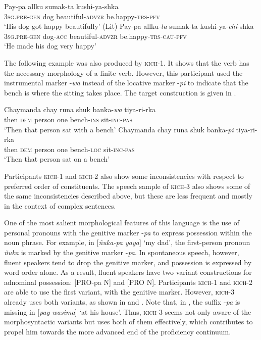 \documentclass[output=paper]{langscibook}
\begin{document}
\ea
\ea\label{ex:7:6a}
\gll   Pay-pa             allku       sumak-ta            kushi-ya-shka\\
             \textsc{3sg.pre-gen}    dog            beautiful-\textsc{advzr}     be.happy-\textsc{trs}{}-\textsc{pfv}\\
  \glt ‘His dog got happy beautifully’ (Lit)
\ex\label{ex:7:6b}
\gll Pay-pa        allku-\textit{ta} sumak-ta       kushi-ya-\textit{chi}{{}-shka}\\
\textsc{3sg.pre-gen}   dog-\textsc{acc}        beautiful-\textsc{advzr}     be.happy-\textsc{trs}{}-\textsc{cau}{}-\textsc{pfv}\\
  \glt ‘He made his dog very happy’
\z
\z

The following example was also produced by \textsc{kich-}1. It shows that the verb has the necessary morphology of a finite verb. However, this participant used the instrumental marker \-\-\nobreakdash-\textit{wa} instead of the locative marker \-\nobreakdash-\textit{pi} to indicate that the bench is where the sitting takes place. The target construction is given in .%

\ea
\ea\label{ex:7:7a}
\gll Chaymanda       chay   runa      shuk    banka-\textit{wa} tiya-ri-rka\\
         then      \textsc{dem}     person   one   bench-\textsc{ins}    sit-\textsc{inc}{}-\textsc{pas}\\
\glt          ‘Then that person sat with a bench’
\ex\label{ex:7:7b}
\gll Chaymanda       chay   runa      shuk   banka-\textit{pi} tiya-ri-rka\\
  then      \textsc{dem}     person   one   bench-\textsc{loc}    sit-\textsc{inc}{}-\textsc{pas}\\
  \glt ‘Then that person sat on a bench’
\z
\z

Participants \textsc{kich-}1 and \textsc{kich-}2 also show some inconsistencies with respect to preferred order of constituents. The speech sample of \textsc{kich-}3 also shows some of the same inconsistencies described above, but these are less frequent and mostly in the context of complex sentences.

One of the most salient morphological features of this language is the use of personal pronouns with the genitive marker -\textit{pa} to express possession within the noun phrase. For example, in [\textit{ñuka-pa yaya}] ‘my dad’, the first-person pronoun \textit{ñuka} is marked by the genitive marker \nobreakdash-\textit{pa}. In spontaneous speech, however, fluent speakers tend to drop the genitive marker, and possession is expressed by word order alone. As a result, fluent speakers have two variant constructions for adnominal possession: [PRO-pa N] and [PRO N]. Participants \textsc{kich-}1 and \textsc{kich-}2 are able to use the first variant, with the genitive marker. However, \textsc{kich-}3 already uses both variants, as shown in  and . Note that, in , the suffix -\textit{pa} is missing in [\textit{pay wasima}] ‘at his house’. Thus, \textsc{kich-}3 seems not only aware of the morphosyntactic variants but uses both of them effectively, which contributes to propel him towards the more advanced end of the proficiency continuum.
\end{document}
